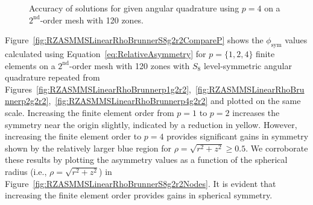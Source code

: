 \documentclass[12pt]{article}
\begin{document}
\begin{figure}[!htb]
\centering
{}
\caption{Accuracy of solutions for given angular quadrature using $p=4$ on a $2^\text{nd}$-order mesh with 120 zones.}
\label{fig:RZASMMSLinearRhoBrunnerp4g2r2Accuracy}
\end{figure}

\FloatBarrier

Figure~\ref{fig:RZASMMSLinearRhoBrunnerS8g2r2CompareP} shows the $\phi_\text{sym}$ values calculated using Equation~\ref{eq:RelativeAsymmetry} for $p=\{1,2,4\}$ finite elements on a $2^\text{nd}$-order mesh with 120 zones with $S_8$ level-symmetric angular quadrature repeated from Figures~\ref{fig:RZASMMSLinearRhoBrunnerp1g2r2},~\ref{fig:RZASMMSLinearRhoBrunnerp2g2r2},~\ref{fig:RZASMMSLinearRhoBrunnerp4g2r2} and plotted on the same scale. Increasing the finite element order from $p=1$ to $p=2$ increases the symmetry near the origin slightly, indicated by a reduction in yellow. However, increasing the finite element order to $p=4$ provides significant gains in symmetry shown by the relatively larger blue region for $\rho=\sqrt{r^2+z^2} \geq 0.5$. We corroborate these results by plotting the asymmetry values as a function of the spherical radius (i.e., $\rho=\sqrt{r^2+z^2}$) in Figure~\ref{fig:RZASMMSLinearRhoBrunnerS8g2r2Nodes}. It is evident that increasing the finite element order provides gains in spherical symmetry.
\end{document}
